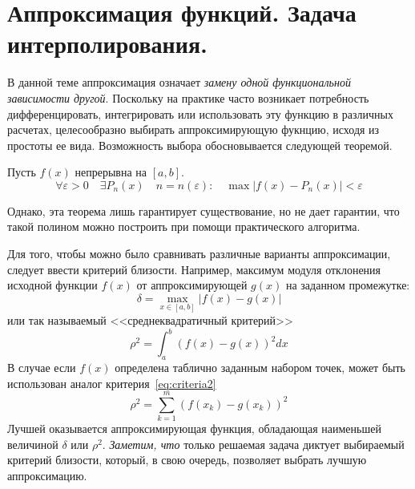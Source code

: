\documentclass[../../calc-math-exam-2023.tex]{subfiles}
\begin{document}
    \section{Аппроксимация функций. Задача интерполирования.}\label{sec:ch05}
    В данной теме аппроксимация означает \emph{замену одной функциональной зависимости
    другой}. Поскольку на практике часто возникает потребность дифференцировать,
    интегрировать или использовать эту функцию в различных расчетах, целесообразно
    выбирать аппроксимирующую фукнцию, исходя из простоты ее вида. Возможность выбора
    обосновывается следующей теоремой.
    \begin{theorem}
        Пусть $f(x)$ непрерывна на $[a, b]$.
        \begin{equation*}
            \forall \varepsilon > 0 \quad \exists P_n(x) \quad n = n(\varepsilon) : \quad \max |f(x) - P_n(x)| < \varepsilon
        \end{equation*}
    \end{theorem}
    Однако, эта теорема лишь гарантирует существование, но не дает гарантии, что такой полином
    можно построить при помощи практического алгоритма.

    Для того, чтобы можно было сравнивать различные варианты аппроксимации, следует
    ввести критерий близости. Например, максимум модуля отклонения исходной функции
    $f(x)$ от аппроксимирующей $g(x)$ на заданном промежутке:
    \begin{equation}
        \delta = \max_{x \in [a, b]} |f(x) - g(x)|\label{eq:criteria1}
    \end{equation}
    или так называемый <<среднеквадратичный критерий>>
    \begin{equation}
        \rho^2 = \int_a^b \left( f(x) - g(x) \right)^2 dx\label{eq:criteria2}
    \end{equation}
    В случае если $f(x)$ определена таблично заданным набором точек, может быть использован
    аналог критерия~\eqref{eq:criteria2}
    \begin{equation}
        \rho^2 = \sum_{k=1}^m \left( f(x_k) - g(x_k) \right)^2\label{eq:criteria3}
    \end{equation}
    Лучшей оказывается аппроксимирующая функция, обладающая наименьшей величиной $\delta$ или $\rho^2$.
    \emph{Заметим, что} только решаемая задача диктует выбираемый критерий близости, который, в свою очередь,
    позволяет выбрать лучшую аппроксимацию.
\end{document}
